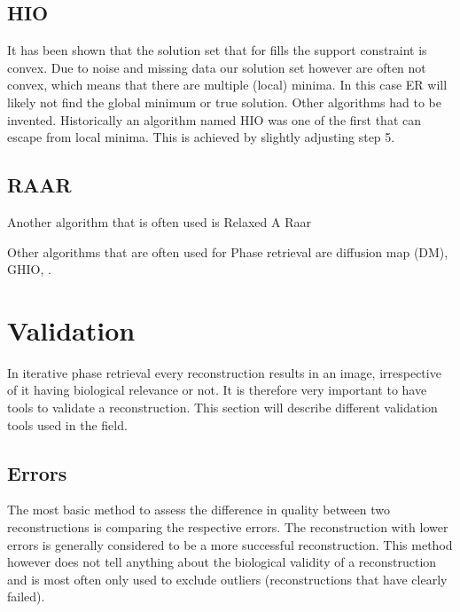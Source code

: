 \subsection{HIO}
It has been shown that the solution set that for fills the support constraint is convex. Due to noise and missing data our solution set however are often not convex, which means that there are multiple (local) minima. In this case ER will likely not find the global minimum or true solution. Other algorithms had to be invented. Historically an algorithm named HIO was one of the first that can escape from local minima. This is achieved by slightly adjusting step 5. 

\subsection{RAAR}
Another algorithm that is often used is Relaxed A
Raar 

Other algorithms that are often used for Phase retrieval are diffusion map (DM), GHIO, .

\section{Validation}
In iterative phase retrieval every reconstruction results in an image, irrespective of it having biological relevance or not. It is therefore very important to have tools to validate a reconstruction. This section will describe different validation tools used in the field.

\subsection{Errors}
The most basic method to assess the difference in quality between two reconstructions is comparing the respective errors. The reconstruction with lower errors is generally considered to be a more successful reconstruction. This method however does not tell anything about the biological validity of a reconstruction and is most often only used to exclude outliers (reconstructions that have clearly failed).
 
